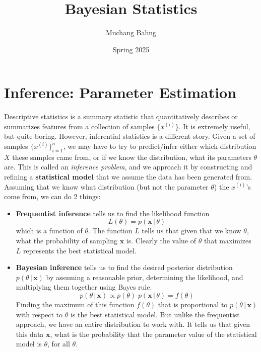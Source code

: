 \documentclass{article}
\begin{document}
\title{Bayesian Statistics}
\author{Muchang Bahng}
\date{Spring 2025}

\maketitle
\tableofcontents
\pagebreak



\section{Inference: Parameter Estimation}

  Descriptive statistics is a summary statistic that quantitatively describes or summarizes features from a collection of samples $\{x^{(i)}\}$. It is extremely useful, but quite boring. However, inferential statistics is a different story. Given a set of samples $\{x^{(i)}\}_{i=1}^n$, we may have to try to predict/infer either which distribution $X$ these samples came from, or if we know the distribution, what its parameters $\theta$ are. This is called an \textit{inference problem}, and we approach it by constructing and refining a \textbf{statistical model} that we assume the data has been generated from. Assuming that we know what distribution (but not the parameter $\theta$) the $x^{(i)}$'s come from, we can do 2 things:

  \begin{itemize}
    \item \textbf{Frequentist inference} tells us to find the likelihood function
    \begin{equation}
      L(\theta) = p(\mathbf{x}\,|\,\theta)
    \end{equation}
    which is a function of $\theta$. The function $L$ tells us that given that we know $\theta$, what the probability of sampling $\mathbf{x}$ is. Clearly the value of $\theta$ that maximizes $L$ represents the best statistical model.
    
    \item \textbf{Bayesian inference} tells us to find the desired posterior distribution $p(\theta\,|\,\mathbf{x})$ by assuming a reasonable prior, determining the likelihood, and multiplying them together using Bayes rule.
    \begin{equation}
      p(\theta\,|\,\mathbf{x}) \propto p(\theta)\; p(\mathbf{x}\,|\,\theta) = f(\theta)
    \end{equation}
    Finding the maximum of this function $f(\theta)$ that is proportional to $p(\theta\,|\,\mathbf{x})$ with respect to $\theta$ is the best statistical model. But unlike the frequentist approach, we have an entire distribution to work with. It tells us that given this data $\mathbf{x}$, what is the probability that the parameter value of the statistical model is $\theta$, for all $\theta$.
  \end{itemize}
\end{document}
